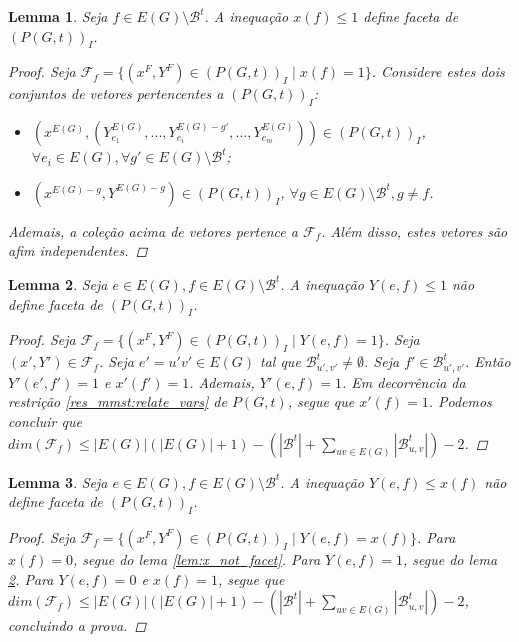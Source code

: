 \documentclass[11pt,reqno]{amsart}
\newcommand{\spanBridge}{\mathcal{B}}
\newcommand{\BridgeuvPrime}{\spanBridge_{u',v'}^{t}}
\newcommand{\Bridgeuv}{\spanBridge_{u,v}^{t}}
\newcommand{\Bridge}{\spanBridge^{t}}
\newtheorem{lema}{Lemma}
\newcommand{\incid}{\mathcal{X}}
\newcommand{\incidY}{\mathcal{Y}}
\newcommand{\facetF}{\mathcal{F}}
\begin{document}
\begin{lema}
Seja $f \in E(G) \setminus \Bridge$. A inequação $x(f) \le 1$ define faceta de 
$(P(G,t))_{I}$.
\begin{proof}
Seja $\facetF_f = \{(x^{F},Y^{F}) \in (P(G,t))_I\; |\; x(f) = 1\}$. 
Considere estes dois conjuntos de vetores pertencentes a $(P(G,t))_{I}$:
\begin{itemize}
  \item $(x^{E(G)}, (Y_{e_1}^{E(G)},...,Y_{e_i}^{E(G)-g'},...,Y_{e_m}^{E(G)})) \in (P(G,t))_I$,
 \\
$\forall e_i \in E(G), \forall g' \in E(G) \setminus \Bridge$;
  \item $(x^{E(G)-g}, Y^{E(G)-g}) \in (P(G,t))_I$, 
$\forall g \in E(G) \setminus \Bridge, g \neq f$. 
\end{itemize}
Ademais, a coleção acima de vetores pertence a $\facetF_f$. 
Além disso, estes vetores são afim independentes.
\end{proof}
\end{lema}

\begin{lema}
\label{lem:Y_not_facet}
Seja $e \in E(G), f \in E(G) \setminus \Bridge$. A inequação $Y(e,f) \le 1$ 
não define faceta de $(P(G,t))_I$.
\begin{proof}
Seja $\facetF_f = \{(x^{F},Y^{F}) \in (P(G,t))_I\; |\; Y(e,f) = 1\}$. Seja 
$(x',Y') \in \facetF_f$. Seja $e'=u'v' \in E(G)$ tal que 
$\BridgeuvPrime \neq \emptyset$. Seja 
$f'\in \BridgeuvPrime$. 
Então $Y'(e',f') = 1$ e $x'(f') = 1$. Ademais, 
$Y'(e,f) = 1$. Em decorrência da restrição \ref{res_mmst:relate_vars} de 
$P(G,t)$, segue que $x'(f) = 1$. Podemos concluir que \\
\mbox{$dim(\facetF_f) \le |E(G)|(|E(G)|+1) - (|\Bridge|+\sum_{uv \in E(G)}|\Bridgeuv|) - 2$.}
\end{proof}
\end{lema}

\begin{lema}
Seja $e \in E(G), f \in E(G) \setminus \Bridge$. A inequação $Y(e,f) \le x(f)$ 
não define faceta de $(P(G,t))_{I}$.
\begin{proof}
Seja $\facetF_f = \{(x^{F},Y^{F}) \in (P(G,t))_I\; |\; Y(e,f) = x(f)\}$. 
Para $x(f) = 0$, segue do lema \ref{lem:x_not_facet}. 
Para $Y(e,f) = 1$, segue do lema \ref{lem:Y_not_facet}. 
Para $Y(e,f) = 0$ e $x(f) = 1$, segue que 
\mbox{$dim(\facetF_f) \le |E(G)|(|E(G)|+1) - (|\Bridge|+\sum_{uv \in E(G)}|\Bridgeuv|) - 2$}, concluindo a prova.
\end{proof}
\end{lema}
\end{document}
